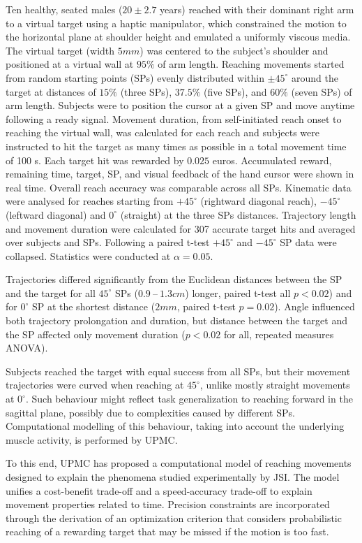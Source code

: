 Ten healthy, seated males ($20 \pm 2.7$ years) reached with their dominant right arm to a virtual target using a haptic manipulator, which constrained the motion to the horizontal plane at shoulder height and emulated a uniformly viscous media. The virtual target (width $5mm$) was centered to the subject’s shoulder and positioned at a virtual wall at $95\%$ of arm length. Reaching movements started from random starting points (SPs) evenly distributed within $\pm 45^{\circ}$ around the target at distances of $15\%$ (three SPs), $37.5\%$ (five SPs), and $60\%$ (seven SPs) of arm length. Subjects were to position the cursor at a given SP and move anytime following a ready signal. Movement duration, from self-initiated reach onset to reaching the virtual wall, was calculated for each reach and subjects were instructed to hit the target as many times as possible in a total movement time of 100 s. Each target hit was rewarded by $0.025$ euros. Accumulated reward, remaining time, target, SP, and visual feedback of the hand cursor were shown in real time. Overall reach accuracy was comparable across all SPs.
Kinematic data were analysed for reaches starting from $+45^{\circ}$ (rightward diagonal reach), $-45^{\circ}$ (leftward diagonal) and $0^{\circ}$ (straight) at the three SPs distances. Trajectory length and movement duration were calculated for 307 accurate target hits and averaged over subjects and SPs. Following a paired t-test $+45^{\circ}$ and $-45^{\circ}$ SP data were collapsed. Statistics were conducted at $\alpha = 0.05$.

Trajectories differed significantly from the Euclidean distances between the SP and the target for all $45^{\circ}$ SPs ($0.9~–~1.3 cm$) longer, paired t-test all $p<0.02$) and for $0^{\circ}$ SP at the shortest distance ($2mm$, paired t-test $p = 0.02$). Angle influenced both trajectory prolongation and duration, but distance between the target and the SP affected only movement duration ($p < 0.02$ for all, repeated measures ANOVA).

Subjects reached the target with equal success from all SPs, but their movement trajectories were curved when reaching at $45^{\circ}$, unlike mostly straight movements at $0^{\circ}$. Such behaviour might reflect task generalization to reaching forward in the sagittal plane\cite{GallivanNatureCom2015}, possibly due to complexities caused by different SPs. Computational modelling of this behaviour, taking into account the underlying muscle activity, is performed by UPMC.


To this end, UPMC has proposed a computational model of reaching movements designed to explain the phenomena studied experimentally by JSI. The model unifies a cost-benefit trade-off \cite{rigoux12_plos} and a speed-accuracy trade-off \cite{fitts54_JEP} to explain movement properties related to time. Precision constraints are incorporated through the derivation of an optimization criterion that considers probabilistic reaching of a rewarding target that may be missed if the motion is too fast.

